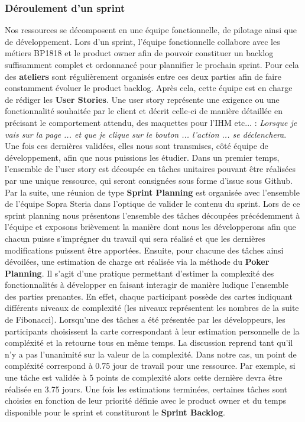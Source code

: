	\subsubsection{Déroulement d'un sprint}
	Nos ressources se décomposent en une équipe fonctionnelle, de pilotage ainsi que de développement. Lors d'un sprint, l'équipe fonctionnelle collabore avec les métiers BP1818 et le product owner afin de pouvoir constituer un backlog suffisamment complet et ordonnancé pour plannifier le prochain sprint. Pour cela des \textbf{ateliers} sont régulièrement organisés entre ces deux parties afin de faire constamment évoluer le product backlog. Après cela, cette équipe est en charge de rédiger les \textbf{User Stories}. Une user story représente une exigence ou une fonctionnalité souhaitée par le client et décrit celle-ci de manière détaillée en précisant le comportement attendu, des maquettes pour l'IHM etc... : \textit{Lorsque je vais sur la page ... et que je clique sur le bouton ... l'action ... se déclenchera}. \\
	
	Une fois ces dernières validées, elles nous sont transmises, côté équipe de développement, afin que nous puissions les étudier. Dans un premier temps, l’ensemble de l’user story est découpée en tâches unitaires pouvant être réalisées par une unique ressource, qui seront consignées sous forme d’issue sous Github. Par la suite, une réunion de type \textbf{Sprint Planning} est organisée avec l'ensemble de l'équipe Sopra Steria dans l’optique de valider le contenu du sprint. Lors de ce sprint planning nous présentons l’ensemble des tâches découpées précédemment à l’équipe et exposons brièvement la manière dont nous les développerons afin que chacun puisse s’imprégner du travail qui sera réalisé et que les dernières modifications puissent être apportées. Ensuite, pour chacune des tâches ainsi dévoilées, une estimation de charge est réalisée via la méthode du \textbf{Poker Planning}. Il s’agit d’une pratique permettant d’estimer la complexité des fonctionnalités à développer en faisant interagir de manière ludique l’ensemble des parties prenantes. En effet, chaque participant possède des cartes indiquant différents niveaux de complexité (les niveaux représentent les nombres de la suite de Fibonacci). Lorsqu’une des tâches a été présentée par les développeurs, les participants choisissent la carte correspondant à leur estimation personnelle de la compléxité et la retourne tous en même temps. La discussion reprend tant qu’il n’y a pas l’unanimité sur la valeur de la complexité. Dans notre cas, un point de compléxité correspond à 0.75 jour de travail pour une ressource. Par exemple, si une tâche est validée à 5 points de complexité alors cette dernière devra être réalisée en 3.75 jours. Une fois les estimations terminées, certaines tâches sont choisies en fonction de leur priorité définie avec le product owner et du temps disponible pour le sprint et constituront le \textbf{Sprint Backlog}.\\
	
